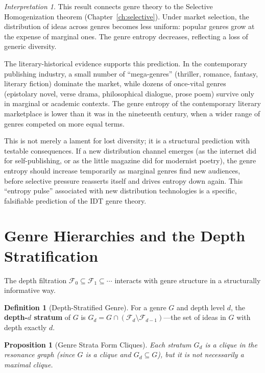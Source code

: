 \documentclass[11pt,openany]{book}
\theoremstyle{definition}
\newtheorem{definition}[axiom]{Definition}
\theoremstyle{plain}
\newtheorem{proposition}[axiom]{Proposition}
\theoremstyle{remark}
\newtheorem{interpretation}[axiom]{Interpretation}
\newcommand{\Filt}[1]{\mathcal{F}_{#1}}     %
\begin{document}
\begin{interpretation}
This result connects genre theory to the Selective Homogenization theorem (Chapter~\ref{ch:selective}). Under market selection, the distribution of ideas across genres becomes less uniform: popular genres grow at the expense of marginal ones. The genre entropy decreases, reflecting a loss of generic diversity.

The literary-historical evidence supports this prediction. In the contemporary publishing industry, a small number of ``mega-genres'' (thriller, romance, fantasy, literary fiction) dominate the market, while dozens of once-vital genres (epistolary novel, verse drama, philosophical dialogue, prose poem) survive only in marginal or academic contexts. The genre entropy of the contemporary literary marketplace is lower than it was in the nineteenth century, when a wider range of genres competed on more equal terms.

This is not merely a lament for lost diversity; it is a structural prediction with testable consequences. If a new distribution channel emerges (as the internet did for self-publishing, or as the little magazine did for modernist poetry), the genre entropy should increase temporarily as marginal genres find new audiences, before selective pressure reasserts itself and drives entropy down again. This ``entropy pulse'' associated with new distribution technologies is a specific, falsifiable prediction of the IDT genre theory.
\end{interpretation}

\section{Genre Hierarchies and the Depth Stratification}

The depth filtration $\Filt{0} \subseteq \Filt{1} \subseteq \cdots$ interacts with genre structure in a structurally informative way.

\begin{definition}[Depth-Stratified Genre]
For a genre $G$ and depth level $d$, the \textbf{depth-$d$ stratum} of $G$ is $G_d = G \cap (\Filt{d} \setminus \Filt{d-1})$---the set of ideas in $G$ with depth exactly $d$.
\end{definition}

\begin{proposition}[Genre Strata Form Cliques]
Each stratum $G_d$ is a clique in the resonance graph (since $G$ is a clique and $G_d \subseteq G$), but it is not necessarily a \emph{maximal} clique.
\end{proposition}
\end{document}
